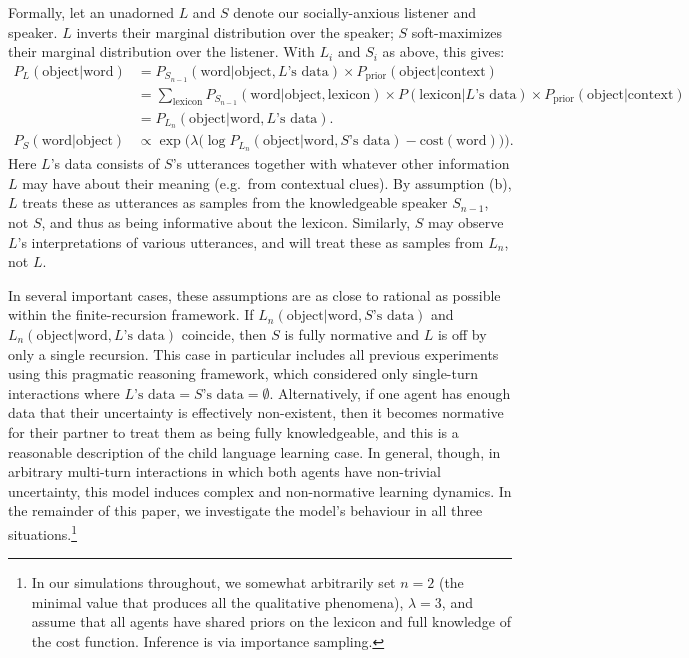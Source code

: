 \documentclass{article} %
\newcommand{\word}{\text{word}}
\newcommand{\obj}{\text{object}}
\newcommand{\lex}{\text{lexicon}}
\newcommand{\prior}{P_{\text{prior}}(\obj | \text{context})}
\begin{document}
Formally, let an unadorned $L$ and $S$ denote our socially-anxious listener and speaker. $L$ inverts their marginal distribution over the speaker; $S$ soft-maximizes their marginal distribution over the listener. With $L_i$ and $S_i$ as above, this gives:
\begin{align*}
  P_L(\obj | \word) &= P_{S_{n-1}}(\word | \obj, \text{$L$'s data}) \times \prior \\
    &= \sum_\lex P_{S_{n-1}}(\word | \obj, \lex) \times P(\lex | \text{$L$'s data}) \times \prior \\
    &= P_{L_n}(\obj | \word, \text{$L$'s data}). \\
  P_S(\word | \obj) &\propto \exp\Big(\lambda \big(\log P_{L_n}(\obj | \word, \text{$S$'s data}) - \text{cost}(\word)\big)\Big).
\end{align*}
Here $L$'s data consists of $S$'s utterances together with whatever other information $L$ may have about their meaning (e.g.~from contextual clues). By assumption (b), $L$ treats these as utterances as samples from the knowledgeable speaker $S_{n-1}$, not $S$, and thus as being informative about the lexicon. Similarly, $S$ may observe $L$'s interpretations of various utterances, and will treat these as samples from $L_n$, not $L$.

In several important cases, these assumptions are as close to rational as possible within the finite-recursion framework. If $L_n(\obj | \word, \text{$S$'s data})$ and $L_n(\obj | \word, \text{$L$'s data})$ coincide, then  $S$ is fully normative and $L$ is off by only a single recursion. This case in particular includes all previous experiments using this pragmatic reasoning framework, which considered only single-turn interactions where $\text{$L$'s data} = \text{$S$'s data} = \emptyset$. Alternatively, if one agent has enough data that their uncertainty is effectively non-existent, then it becomes normative for their partner to treat them as being fully knowledgeable, and this is a reasonable description of the child language learning case. In general, though, in arbitrary multi-turn interactions in which both agents have non-trivial uncertainty, this model induces complex and non-normative learning dynamics. In the remainder of this paper, we investigate the model's behaviour in all three situations.\footnote{In our simulations throughout, we somewhat arbitrarily set $n = 2$ (the minimal value that produces all the qualitative phenomena), $\lambda = 3$, and assume that all agents have shared priors on the lexicon and full knowledge of the cost function. Inference is via importance sampling.}
\end{document}
